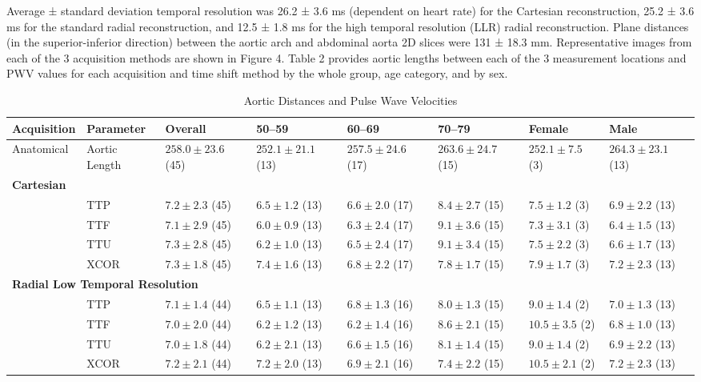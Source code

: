 Average ± standard deviation temporal resolution was 26.2 ± 3.6 ms (dependent on heart rate) for the Cartesian reconstruction, 25.2 ± 3.6 ms for the standard radial reconstruction, and 12.5 ± 1.8 ms for the high temporal resolution (LLR) radial reconstruction. Plane distances (in the superior-inferior direction) between the aortic arch and abdominal aorta 2D slices were 131 ± 18.3 mm. Representative images from each of the 3 acquisition methods are shown in Figure 4. Table 2 provides aortic lengths between each of the 3 measurement locations and PWV values for each acquisition and time shift method by the whole group, age category, and by sex.

\begin{table}[ht]
    \centering
    \caption[Aortic Distances and Pulse Wave Velocities]{Aortic Distances and Pulse Wave Velocities}
    \small
    \begin{tabularx}{\textwidth}{llXXXXXX}
    \toprule
    Acquisition & Parameter & Overall & 50--59 & 60--69 & 70--79 & Female & Male \\
    \midrule

    Anatomical & Aortic Length & 
    $258.0 \pm 23.6$ (45) & 
    $252.1 \pm 21.1$ (13) & 
    $257.5 \pm 24.6$ (17) & 
    $263.6 \pm 24.7$ (15) & 
    $252.1 \pm 7.5$ (3) & 
    $264.3 \pm 23.1$ (13) \\

    \midrule
    \multicolumn{8}{l}{\textbf{Cartesian}} \\

    & TTP  & $7.2 \pm 2.3$ (45) & $6.5 \pm 1.2$ (13) & $6.6 \pm 2.0$ (17) & $8.4 \pm 2.7$ (15) & $7.5 \pm 1.2$ (3) & $6.9 \pm 2.2$ (13) \\
    & TTF  & $7.1 \pm 2.9$ (45) & $6.0 \pm 0.9$ (13) & $6.3 \pm 2.4$ (17) & $9.1 \pm 3.6$ (15) & $7.3 \pm 3.1$ (3) & $6.4 \pm 1.5$ (13) \\
    & TTU  & $7.3 \pm 2.8$ (45) & $6.2 \pm 1.0$ (13) & $6.5 \pm 2.4$ (17) & $9.1 \pm 3.4$ (15) & $7.5 \pm 2.2$ (3) & $6.6 \pm 1.7$ (13) \\
    & XCOR & $7.3 \pm 1.8$ (45) & $7.4 \pm 1.6$ (13) & $6.8 \pm 2.2$ (17) & $7.8 \pm 1.7$ (15) & $7.9 \pm 1.7$ (3) & $7.2 \pm 2.3$ (13) \\

    \midrule
    \multicolumn{8}{l}{\textbf{Radial \- Low Temporal Resolution}} \\

    & TTP  & $7.1 \pm 1.4$ (44) & $6.5 \pm 1.1$ (13) & $6.8 \pm 1.3$ (16) & $8.0 \pm 1.3$ (15) & $9.0 \pm 1.4$ (2) & $7.0 \pm 1.3$ (13) \\
    & TTF  & $7.0 \pm 2.0$ (44) & $6.2 \pm 1.2$ (13) & $6.2 \pm 1.4$ (16) & $8.6 \pm 2.1$ (15) & $10.5 \pm 3.5$ (2) & $6.8 \pm 1.0$ (13) \\
    & TTU  & $7.0 \pm 1.8$ (44) & $6.2 \pm 2.1$ (13) & $6.6 \pm 1.5$ (16) & $8.1 \pm 1.4$ (15) & $9.0 \pm 1.4$ (2) & $6.9 \pm 2.2$ (13) \\
    & XCOR & $7.2 \pm 2.1$ (44) & $7.2 \pm 2.0$ (13) & $6.9 \pm 2.1$ (16) & $7.4 \pm 2.2$ (15) & $10.5 \pm 2.1$ (2) & $7.2 \pm 2.3$ (13) \\


\end{tabularx}
\end{table}
